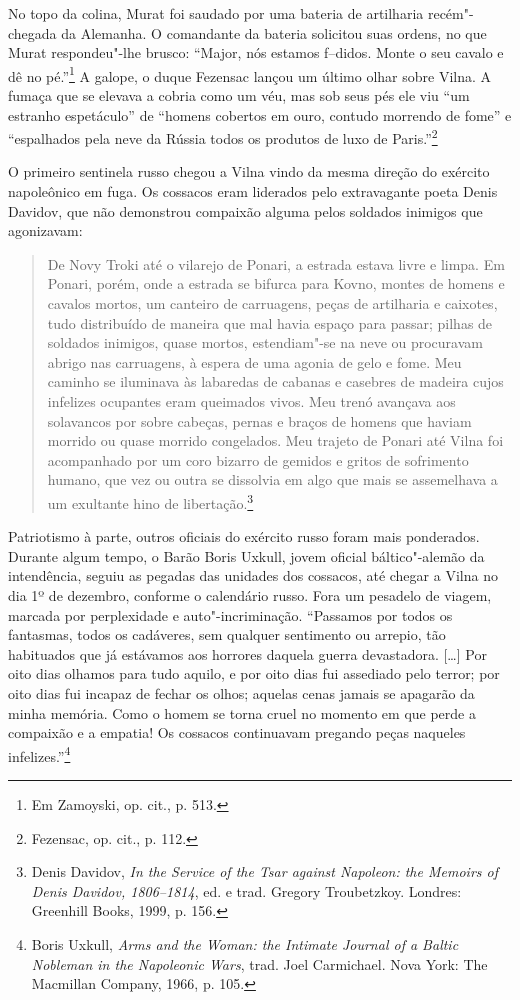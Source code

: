 No topo da colina, Murat foi saudado por uma bateria de artilharia
recém"-chegada da Alemanha. O comandante da bateria solicitou suas
ordens, no que Murat respondeu"-lhe brusco: ``Major, nós estamos
f--didos. Monte o seu cavalo e dê no pé.''\footnote{Em Zamoyski, op. cit., p. 513.} A galope, o duque Fezensac lançou um último olhar sobre Vilna. A fumaça que se elevava a cobria como um véu, mas sob seus
pés ele viu ``um estranho espetáculo'' de ``homens cobertos em ouro,
contudo morrendo de fome'' e ``espalhados pela neve da Rússia todos os
produtos de luxo de Paris.''\footnote{Fezensac, op. cit., p. 112.}

\asterisc

O primeiro sentinela russo chegou a Vilna vindo da mesma direção do
exército napoleônico em fuga. Os cossacos eram liderados pelo
extravagante poeta Denis Davidov, que não demonstrou compaixão alguma
pelos soldados inimigos que agonizavam:

\begin{quote}
De Novy Troki até o vilarejo de Ponari, a estrada estava livre e limpa.
Em Ponari, porém, onde a estrada se bifurca para Kovno, montes de homens
e cavalos mortos, um canteiro de carruagens, peças de artilharia e
caixotes, tudo distribuído de maneira que mal havia espaço para passar;
pilhas de soldados inimigos, quase mortos, estendiam"-se na neve ou
procuravam abrigo nas carruagens, à espera de uma agonia de gelo e fome.
Meu caminho se iluminava às labaredas de cabanas e casebres de madeira
cujos infelizes ocupantes eram queimados vivos. Meu trenó avançava aos
solavancos por sobre cabeças, pernas e braços de homens que haviam
morrido ou quase morrido congelados. Meu trajeto de Ponari até Vilna foi
acompanhado por um coro bizarro de gemidos e gritos de sofrimento
humano, que vez ou outra se dissolvia em algo que mais se assemelhava a
um exultante hino de libertação.\footnote{Denis Davidov, \textit{In the Service of the Tsar against Napoleon: the Memoirs of Denis Davidov, 1806--1814}, ed. e trad. Gregory Troubetzkoy. Londres: Greenhill Books, 1999, p. 156.} 
\end{quote}

Patriotismo à parte, outros oficiais do exército russo foram mais
ponderados. Durante algum tempo, o Barão Boris Uxkull, jovem oficial
báltico"-alemão da intendência, seguiu as pegadas das unidades dos
cossacos, até chegar a Vilna no dia 1º de dezembro, conforme o calendário
russo. Fora um pesadelo de viagem, marcada por perplexidade e
auto"-incriminação. ``Passamos por todos os fantasmas, todos os
cadáveres, sem qualquer sentimento ou arrepio, tão habituados que já
estávamos aos horrores daquela guerra devastadora. [\ldots{}] Por oito
dias olhamos para tudo aquilo, e por oito dias fui assediado pelo
terror; por oito dias fui incapaz de fechar os olhos; aquelas cenas
jamais se apagarão da minha memória. Como o homem se torna cruel no
momento em que perde a compaixão e a empatia! Os cossacos continuavam
pregando peças naqueles infelizes.''\footnote{Boris Uxkull, \textit{Arms and the Woman: the Intimate Journal of a Baltic Nobleman in the Napoleonic Wars}, trad. Joel Carmichael. Nova York: The Macmillan Company, 1966, p. 105.}

